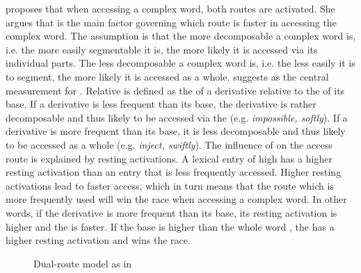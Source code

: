 \cite{Hay.2001,Hay.2003} proposes that when accessing a complex word, both routes are activated. She argues that  is the main factor governing  which route is faster in accessing the complex word. The assumption is that the more decomposable a complex word is, i.e. the more easily segmentable it is, the more likely it is accessed via its individual parts. The less decomposable a complex word is, i.e.  the less easily it is to segment, the more likely it is accessed as a whole. \cite{Hay.2001,Hay.2003} suggests  as the central measurement for . Relative  is defined as the  of a derivative relative to the  of its base. If a derivative is less frequent than its base, the derivative is rather decomposable and thus likely to be accessed via the  (e.g. \textit{impossible, softly}).  If a derivative is more frequent than its base, it is less decomposable and thus likely to be accessed as a whole (e.g. \textit{inject, swiftly}). 
The influence of  on the access route is explained by resting activations. A lexical entry of high  has a higher resting activation than an entry that is less frequently accessed. Higher resting activations lead to faster access, which in turn means that the route which is more frequently used will win the race when accessing a complex word. In other words, if the derivative is more frequent than its base, its resting activation is higher and the  is faster. If the base  is higher than the whole word , the  has a higher resting activation and wins the race.


\begin{figure}
\centering
 	\caption{Dual-route model as in \cite{Hay.2001}\label{fig:Dual-route model}} 
 \end{figure}
 
